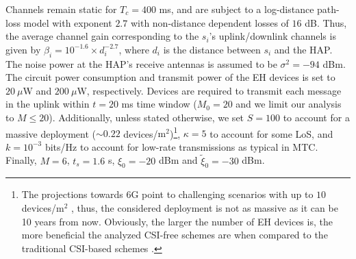 \documentclass[10pt,journal,a4paper]{IEEEtran}
\begin{document}
    	
	Channels remain static for $T_c=400$ ms, and are subject to a log-distance path-loss model with exponent $2.7$ with non-distance dependent losses of $16$ dB. Thus, the average channel gain corresponding to the $s_i$'s uplink/downlink channels is given by $\beta_i=10^{-1.6}\times d_i^{-2.7}$, where $d_i$ is the distance between $s_i$ and the HAP. The noise power at the HAP's receive antennas is assumed to be $\sigma^2=-94$ dBm. The circuit power consumption and transmit power of the EH devices is set to $20\ \mu$W and $200\ \mu$W, respectively. Devices are required to transmit each message in the uplink within $t=20$ ms time window ($M_0=20$ and we limit our analysis to $M\le 20$). 
	Additionally, unless stated otherwise, we set $S=100$ to account for a massive deployment ($\sim 0.22$ devices/$\mathrm{m}^2$)\footnote{The projections towards 6G point to challenging scenarios with up to $10$  devices/$\mathrm{m}^2$ \cite{Mahmood.2019,Mahmood.2020}, thus, the considered deployment is not as massive as it can be 10 years from now. Obviously, the larger the number of EH devices is, the more beneficial the analyzed CSI-free schemes are when compared to the traditional CSI-based schemes \cite{Lopez.2019_CSI}.}, $\kappa=5$ to account for some LoS, and $k= 10^{-3}$ bits/Hz to account for low-rate transmissions as typical in MTC. Finally, $M=6$, $t_s=1.6$ s, $\xi_0=-20$ dBm and $\tilde{\xi}_0=-30$ dBm.
\end{document}
